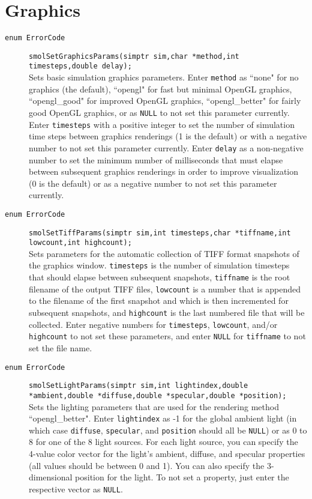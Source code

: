 \documentclass {book}
\begin{document}
\section{Graphics}

\begin{description}

\item[\texttt{enum ErrorCode}]
\texttt{smolSetGraphicsParams(simptr sim,char *method,int timesteps,double delay);}
\hfill \\
Sets basic simulation graphics parameters. Enter \texttt{method} as ``none" for no graphics (the default), ``opengl" for fast but minimal OpenGL graphics, ``opengl\_good" for improved OpenGL graphics, ``opengl\_better" for fairly good OpenGL graphics, or as \texttt{NULL} to not set this parameter currently. Enter \texttt{timesteps} with a positive integer to set the number of simulation time steps between graphics renderings (1 is the default) or with a negative number to not set this parameter currently. Enter \texttt{delay} as a non-negative number to set the minimum number of milliseconds that must elapse between subsequent graphics renderings in order to improve visualization (0 is the default) or as a negative number to not set this parameter currently.

\item[\texttt{enum ErrorCode}]
\texttt{smolSetTiffParams(simptr sim,int timesteps,char *tiffname,int lowcount,int highcount);}
\hfill \\
Sets parameters for the automatic collection of TIFF format snapshots of the graphics window. \texttt{timesteps} is the number of simulation timesteps that should elapse between subsequent snapshots, \texttt{tiffname} is the root filename of the output TIFF files, \texttt{lowcount} is a number that is appended to the filename of the first snapshot and which is then incremented for subsequent snapshots, and \texttt{highcount} is the last numbered file that will be collected. Enter negative numbers for \texttt{timesteps}, \texttt{lowcount}, and/or \texttt{highcount} to not set these parameters, and enter \texttt{NULL} for \texttt{tiffname} to not set the file name.

\item[\texttt{enum ErrorCode}]
\texttt{smolSetLightParams(simptr sim,int lightindex,double *ambient,double *diffuse,double *specular,double *position);}
\hfill \\
Sets the lighting parameters that are used for the rendering method ``opengl\_better". Enter \texttt{lightindex} as -1 for the global ambient light (in which case \texttt{diffuse}, \texttt{specular}, and \texttt{position} should all be \texttt{NULL}) or as 0 to 8 for one of the 8 light sources. For each light source, you can specify the 4-value color vector for the light's ambient, diffuse, and specular properties (all values should be between 0 and 1). You can also specify the 3-dimensional position for the light. To not set a property, just enter the respective vector as \texttt{NULL}.


\end{description}
\end{document}

